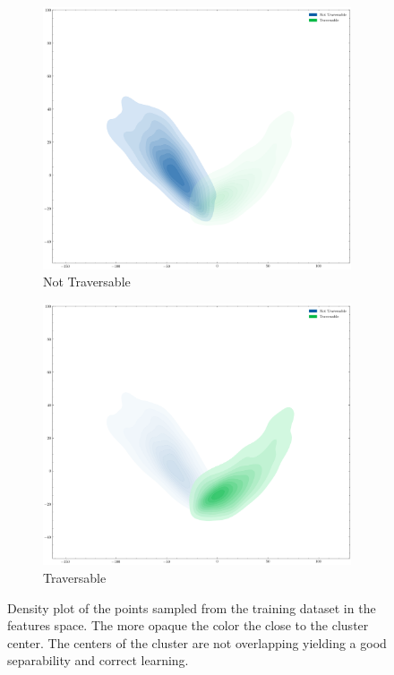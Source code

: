 \documentclass[../document.tex]{subfiles}
\begin{document}
\begin{figure} [htbp]
    \begin{subfigure}[b]{0.48\textwidth}
        \includegraphics[width=\linewidth]{../img/5/pca/pca-0-density.png}
        \caption{Not Traversable}
    \end{subfigure}
    \begin{subfigure}[b]{0.48\textwidth}
        \includegraphics[width=\linewidth]{../img/5/pca/pca-1-density.png}
        \caption{Traversable}
    \end{subfigure}
    \caption{Density plot of the points sampled from the training dataset in the features space. The more opaque the color the close to the cluster center. The centers of the cluster are not overlapping yielding a good separability and correct learning.}
    \end{figure}
\end{document}
